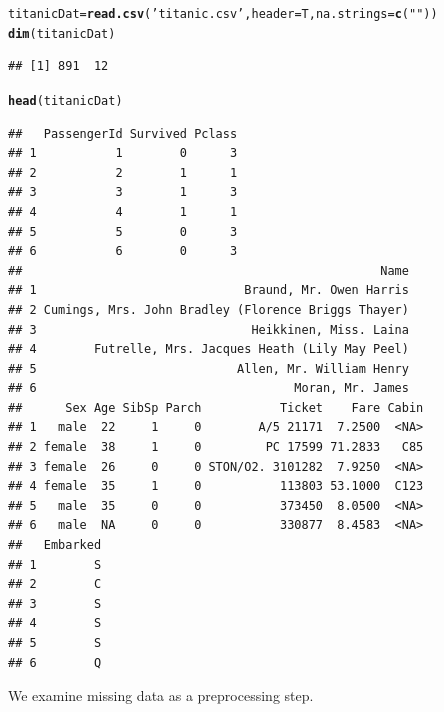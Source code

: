 \documentclass{article}\usepackage[]{graphicx}\usepackage[]{color}
\makeatletter
\newcommand{\hlstr}[1]{\textcolor[rgb]{0.192,0.494,0.8}{#1}}%
\newcommand{\hlstd}[1]{\textcolor[rgb]{0.345,0.345,0.345}{#1}}%
\newcommand{\hlkwb}[1]{\textcolor[rgb]{0.69,0.353,0.396}{#1}}%
\newcommand{\hlkwc}[1]{\textcolor[rgb]{0.333,0.667,0.333}{#1}}%
\newcommand{\hlkwd}[1]{\textcolor[rgb]{0.737,0.353,0.396}{\textbf{#1}}}%
\newenvironment{kframe}{%
 \def\at@end@of@kframe{}%
 \ifinner\ifhmode%
  \def\at@end@of@kframe{\end{minipage}}%
  \begin{minipage}{\columnwidth}%
 \fi\fi%
 \def\FrameCommand##1{\hskip\@totalleftmargin \hskip-\fboxsep
 \colorbox{shadecolor}{##1}\hskip-\fboxsep
     \hskip-\linewidth \hskip-\@totalleftmargin \hskip\columnwidth}%
 \MakeFramed {\advance\hsize-\width
   \@totalleftmargin\z@ \linewidth\hsize
   \@setminipage}}%
 {\par\unskip\endMakeFramed%
 \at@end@of@kframe}
\newenvironment{knitrout}{}{} %
\makeatother
\begin{document}
\begin{knitrout}
\color{fgcolor}\begin{kframe}
\begin{alltt}
\hlstd{titanicDat} \hlkwb{=} \hlkwd{read.csv}\hlstd{(}\hlstr{'titanic.csv'}\hlstd{,}\hlkwc{header}\hlstd{=T,}\hlkwc{na.strings}\hlstd{=}\hlkwd{c}\hlstd{(}\hlstr{""}\hlstd{))}
\hlkwd{dim}\hlstd{(titanicDat)}
\end{alltt}
\begin{verbatim}
## [1] 891  12
\end{verbatim}
\begin{alltt}
\hlkwd{head}\hlstd{(titanicDat)}
\end{alltt}
\begin{verbatim}
##   PassengerId Survived Pclass
## 1           1        0      3
## 2           2        1      1
## 3           3        1      3
## 4           4        1      1
## 5           5        0      3
## 6           6        0      3
##                                                  Name
## 1                             Braund, Mr. Owen Harris
## 2 Cumings, Mrs. John Bradley (Florence Briggs Thayer)
## 3                              Heikkinen, Miss. Laina
## 4        Futrelle, Mrs. Jacques Heath (Lily May Peel)
## 5                            Allen, Mr. William Henry
## 6                                    Moran, Mr. James
##      Sex Age SibSp Parch           Ticket    Fare Cabin
## 1   male  22     1     0        A/5 21171  7.2500  <NA>
## 2 female  38     1     0         PC 17599 71.2833   C85
## 3 female  26     0     0 STON/O2. 3101282  7.9250  <NA>
## 4 female  35     1     0           113803 53.1000  C123
## 5   male  35     0     0           373450  8.0500  <NA>
## 6   male  NA     0     0           330877  8.4583  <NA>
##   Embarked
## 1        S
## 2        C
## 3        S
## 4        S
## 5        S
## 6        Q
\end{verbatim}
\end{kframe}
\end{knitrout}

We examine missing data as a preprocessing step.
\end{document}
